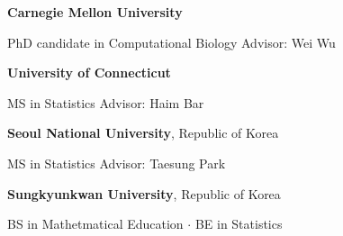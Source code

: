 \documentclass{tidycv} %
\begin{document}
\begin{cveducations}
    {{\bf Carnegie Mellon University}} %
    {
    \begin{cveducationitems} %
        PhD candidate in Computational Biology \hfill Advisor: Wei Wu\\
	\end{cveducationitems}
    }
    {{\bf University of Connecticut}} %
    {
    \begin{cveducationitems} %
        MS in Statistics \hfill Advisor: Haim Bar\\
	\end{cveducationitems}
    }
    {{\bf Seoul National University}, Republic of Korea} %
    {
    \begin{cveducationitems} %
        MS in Statistics \hfill Advisor: Taesung Park\\
	\end{cveducationitems}
    }
    {{\bf Sungkyunkwan University}, Republic of Korea} %
    {
    \begin{cveducationitems} %
        BS in Mathetmatical Education $\cdot$ BE in Statistics\\
	\end{cveducationitems}
    }
\end{cveducations}

\begin{cvpublications}
  
  
  
\end{cvpublications}
\end{document}
